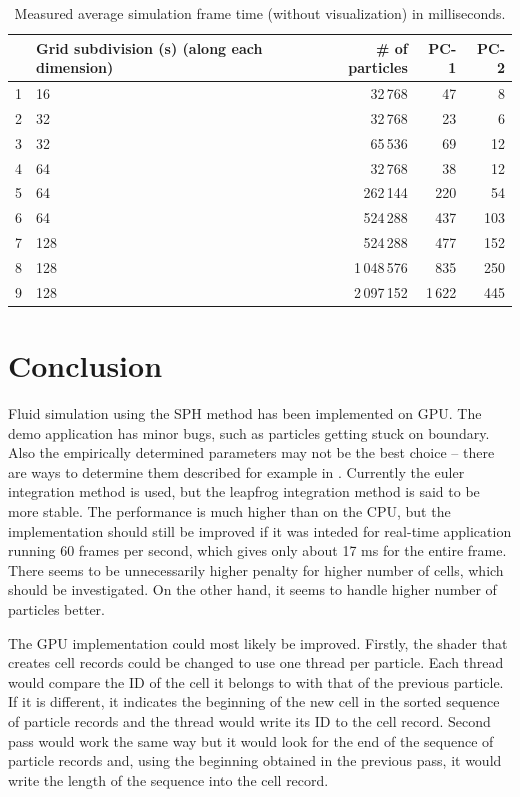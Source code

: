 \documentclass[a4paper,report]{IEEEtran}
\begin{document}
\begin{table}
	\begin{tabularx}{1\linewidth}{r X r r r}
\hline
		& \textbf{Grid subdivision (s)} \newline (along each dimension) & \textbf{\# of particles} & \textbf{PC-1} & \textbf{PC-2} \\
\hline
	1 & 16  & 32\,768 & 47 & 8 \\
	2 & 32  & 32\,768 & 23 & 6 \\
	3 & 32  & 65\,536 & 69 & 12 \\
	4 & 64  & 32\,768 & 38 & 12 \\
	5 & 64  & 262\,144 & 220 & 54 \\
	6 & 64  & 524\,288 & 437 & 103 \\
	7 & 128 & 524\,288 & 477 & 152 \\
	8 & 128 & 1\,048\,576 & 835 & 250 \\
	9 & 128 & 2\,097\,152 & 1\,622 & 445 \\
\hline
\end{tabularx}
	\caption{Measured average simulation frame time (without visualization) in milliseconds.}
	\label{table:results}
\end{table}

\section{Conclusion}
\label{sec:improvements}
Fluid simulation using the SPH method has been implemented on GPU. The demo application has minor bugs, such as particles getting stuck on boundary. Also the empirically determined parameters may not be the best choice -- there are ways to determine them described for example in \cite{Articles:Mao}. Currently the euler integration method is used, but the leapfrog integration method is said to be more stable. The performance is much higher than on the CPU, but the implementation should still be improved if it was inteded for real-time application running 60 frames per second, which gives only about 17 ms for the entire frame. There seems to be unnecessarily higher penalty for higher number of cells, which should be investigated. On the other hand, it seems to handle higher number of particles better.

The GPU implementation could most likely be improved. Firstly, the shader that creates cell records could be changed to use one thread per particle. Each thread would compare the ID of the cell it belongs to with that of the previous particle. If it is different, it indicates the beginning of the new cell in the sorted sequence of particle records and the thread would write its ID to the cell record. Second pass would work the same way but it would look for the end of the sequence of particle records and, using the beginning obtained in the previous pass, it would write the length of the sequence into the cell record.
\end{document}

